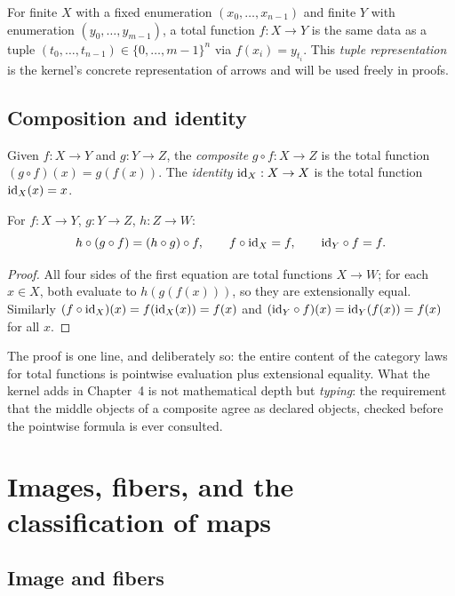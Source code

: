 For finite $X$ with a fixed enumeration $(x_0, \dots, x_{n-1})$ and finite
$Y$ with enumeration $(y_0, \dots, y_{m-1})$, a total function
$f : X \to Y$ is the same data as a tuple
$(t_0, \dots, t_{n-1}) \in \{0, \dots, m-1\}^n$ via
$f(x_i) = y_{t_i}$. This \emph{tuple representation} is the kernel's
concrete representation of arrows and will be used freely in proofs.

\subsection{Composition and identity}

\begin{definition}[Composition]\label{ch02:def:composition}
Given $f : X \to Y$ and $g : Y \to Z$, the \emph{composite}
$g \circ f : X \to Z$ is the total function $(g \circ f)(x) = g(f(x))$.
The \emph{identity} $\mathrm{id}_X : X \to X$ is the total function
$\mathrm{id}_X(x) = x$.
\end{definition}

\begin{proposition}\label{ch02:prop:assoc}
For $f : X \to Y$, $g : Y \to Z$, $h : Z \to W$:
\[
h \circ (g \circ f) = (h \circ g) \circ f, \qquad
f \circ \mathrm{id}_X = f, \qquad \mathrm{id}_Y \circ f = f.
\]
\end{proposition}

\begin{proof}
All four sides of the first equation are total functions $X \to W$; for
each $x \in X$, both evaluate to $h(g(f(x)))$, so they are extensionally
equal. Similarly $(f \circ \mathrm{id}_X)(x) = f(\mathrm{id}_X(x)) = f(x)$ and
$(\mathrm{id}_Y \circ f)(x) = \mathrm{id}_Y(f(x)) = f(x)$ for all $x$.
\end{proof}

The proof is one line, and deliberately so: the entire content of the
category laws for total functions is pointwise evaluation plus extensional
equality. What the kernel adds in Chapter~4 is not mathematical depth but
\emph{typing}: the requirement that the middle objects of a composite agree
as declared objects, checked before the pointwise formula is ever consulted.

\section{Images, fibers, and the classification of maps}\label{ch02:sec:fibers}

\subsection{Image and fibers}

